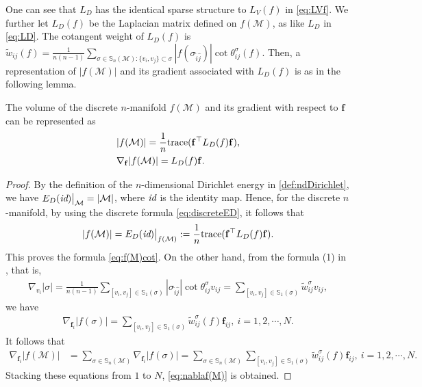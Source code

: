 \documentclass{article}
\begin{document}
One can see that $L_D$ has the identical sparse structure to $L_V(f)$ in \eqref{eq:LVf}. We further let $L_{D}(f)$ be the Laplacian matrix defined on $f(\mathcal{M})$, as like $L_D$ in \eqref{eq:LD}. The cotangent weight of $L_D(f)$ is
$\tilde{w}_{ij}(f) = \frac{1}{n(n-1)} \sum_{\sigma\in \mathbb{S}_n(\mathcal{M}): \{v_i,v_j\} \subset \sigma} |f(\sigma_{\hat{i}\hat{j}})| \cot \theta_{ij}^{\sigma}(f).$
Then, a representation of $|f(\mathcal{M})|$ and its gradient associated with $L_D(f)$ is as in the following lemma.
\begin{lemma} \label{lma:volume}
    The volume of the discrete $n$-manifold $f(\mathcal{M})$ and its gradient with respect to $\mathbf{f}$ can be represented as
    \begin{align}
        &|f(\mathcal{M})| = \frac{1}{n} \mathrm{trace}(\mathbf{f}^\top L_D(f) \mathbf{f}), \label{eq:f(M)cot}\\
        &\nabla_\mathbf{f} |f(\mathcal{M})| = L_D(f) \mathbf{f}. \label{eq:nablaf(M)}
    \end{align}
\end{lemma}

\begin{proof}
    By the definition of the $n$-dimensional Dirichlet energy in \eqref{def:ndDirichlet}, we have $E_D(\emph{id})\big|_\mathcal{M} = |\mathcal{M}|$, where $\emph{id}$ is the identity map. Hence, for the discrete $n$-manifold, by using the discrete formula \eqref{eq:discreteED}, it follows that
    \begin{align} \label{eq:EDid=v}
        |f(\mathcal{M})| = E_D(\emph{id})\big|_{f(\mathcal{M})} := \frac{1}{n} \mathrm{trace}(\mathbf{f}^\top L_D(f) \mathbf{f}).
    \end{align}
    This proves the formula \eqref{eq:f(M)cot}. On the other hand, from the formula (1) in \cite{Crane19}, that is,
\begin{align} \label{eq:citecrane1}
    \nabla_{v_{i}} |\sigma|
    = \frac{1}{n(n-1)}\sum_{[v_i,v_j]\in \mathbb{S}_1(\sigma)} |\sigma_{\hat{i}\hat{j}}| \cot\theta_{ij}^\sigma v_{ij}
    = \sum_{[v_i,v_j]\in \mathbb{S}_1(\sigma)} \tilde{w}_{ij}^\sigma v_{ij},
\end{align}
    we have
    \begin{align} \label{eq:nablafsigma}
        \nabla_{\mathbf{f}_{i}} |f(\sigma)|
        = \sum_{[{v}_i,{v}_j]\in \mathbb{S}_1(\sigma)} \tilde{w}_{ij}^\sigma(f) \mathbf{f}_{ij}
        , ~i = 1,2,\cdots,N.
    \end{align}
    It follows that
    \begin{align}
        \nabla_{\mathbf{f}_{i}} |f(\mathcal{M})| &= \sum_{\sigma\in \mathbb{S}_n(\mathcal{M})} \nabla_{\mathbf{f}_{i}} |f(\sigma)|
        = \sum_{\sigma\in \mathbb{S}_n(\mathcal{M})} \sum_{[v_i,v_j] \in \mathbb{S}_1(\sigma)} \tilde{w}_{ij}^\sigma(f) \mathbf{f}_{ij}
        , ~i = 1,2,\cdots,N.
    \end{align}
    Stacking these equations from $1$ to $N$, \eqref{eq:nablaf(M)} is obtained.
\end{proof}
\end{document}
